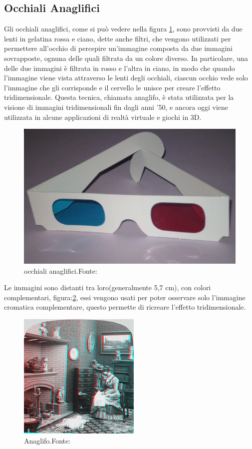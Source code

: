 \documentclass[
a4paper,
cleardoublepage=empty,
headings=twolinechapter,
numbers=autoenddot,
]{scrbook}
\begin{document}
	\subsection{Occhiali Anaglifici}\label{chap:occhiali_anaglifici}
	Gli occhiali anaglifici, come si può vedere nella figura \ref{fig:occhiali_anaglifici}, sono provvisti da due lenti in gelatina rossa e ciano, dette anche filtri, che vengono utilizzati per permettere all'occhio di percepire un'immagine composta da due immagini sovrapposte, ognuna delle quali filtrata da un colore diverso. In particolare, una delle due immagini è filtrata in rosso e l'altra in ciano, in modo che quando l'immagine viene vista attraverso le lenti degli occhiali, ciascun occhio vede solo l'immagine che gli corrisponde e il cervello le unisce per creare l'effetto tridimensionale. Questa tecnica, chiamata anaglifo, è stata utilizzata per la visione di immagini tridimensionali fin dagli anni '50, e ancora oggi viene utilizzata in alcune applicazioni di realtà virtuale e giochi in 3D.
	\begin{figure}[H]
		\centering
		\includegraphics[width=0.6\linewidth]{image/occhiali_anaglifici}
		\caption{occhiali anaglifici.Fonte:\cite{Anaglifo_image}}
		\label{fig:occhiali_anaglifici}
	\end{figure}
	Le immagini sono distanti tra loro(generalmente 5,7 cm), con colori complementari, figura:\ref{fig:anaglifo}, essi vengono usati per poter osservare solo l'immagine cromatica complementare, questo permette di ricreare l'effetto tridimensionale.
	\begin{figure}[H]
		\centering
		\includegraphics[width=0.6\linewidth]{image/anaglifo}
		\caption{Anaglifo.Fonte:\cite{Anaglifo_image}}
		\label{fig:anaglifo}
	\end{figure}
	
\end{document}
